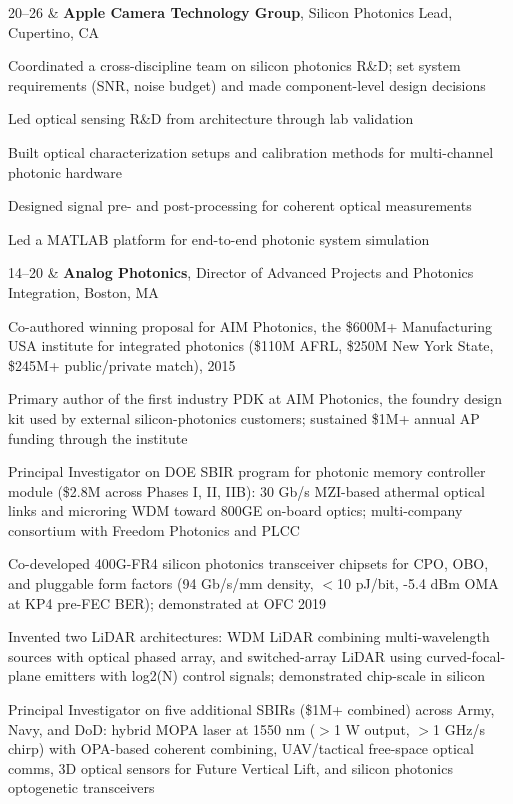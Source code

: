 \begin{resumetabular}
  20--26 &
  \textbf{Apple Camera Technology Group}, Silicon Photonics Lead, Cupertino, CA
  \begin{jobitems}
    \item Coordinated a cross-discipline team on silicon photonics R\&D; set system requirements (SNR, noise budget) and made component-level design decisions
    \item Led optical sensing R\&D from architecture through lab validation
    \item Built optical characterization setups and calibration methods for multi-channel photonic hardware
    \item Designed signal pre- and post-processing for coherent optical measurements
    \item Led a MATLAB platform for end-to-end photonic system simulation
  \end{jobitems}
  \end{resumetabular}

\vspace{0.3em}

\begin{resumetabular}
14--20 &
\textbf{Analog Photonics}, Director of Advanced Projects and Photonics Integration, Boston, MA
\begin{jobitems}
  \item Co-authored winning proposal for AIM Photonics, the \$600M+ Manufacturing USA institute for integrated photonics (\$110M AFRL, \$250M New York State, \$245M+ public/private match), 2015
  \item Primary author of the first industry PDK at AIM Photonics, the foundry design kit used by external silicon-photonics customers; sustained \$1M+ annual AP funding through the institute
  \item Principal Investigator on DOE SBIR program for photonic memory controller module (\$2.8M across Phases I, II, IIB): 30 Gb/s MZI-based athermal optical links and microring WDM toward 800GE on-board optics; multi-company consortium with Freedom Photonics and PLCC
  \item Co-developed 400G-FR4 silicon photonics transceiver chipsets for CPO, OBO, and pluggable form factors (94 Gb/s/mm density, $<$10 pJ/bit, -5.4 dBm OMA at KP4 pre-FEC BER); demonstrated at OFC 2019
  \item Invented two LiDAR architectures: WDM LiDAR combining multi-wavelength sources with optical phased array, and switched-array LiDAR using curved-focal-plane emitters with log2(N) control signals; demonstrated chip-scale in silicon
  \item Principal Investigator on five additional SBIRs (\$1M+ combined) across Army, Navy, and DoD: hybrid MOPA laser at 1550 nm ($>$1 W output, $>$1 GHz/\textmu s chirp) with OPA-based coherent combining, UAV/tactical free-space optical comms, 3D optical sensors for Future Vertical Lift, and silicon photonics optogenetic transceivers
\end{jobitems}
\end{resumetabular}

